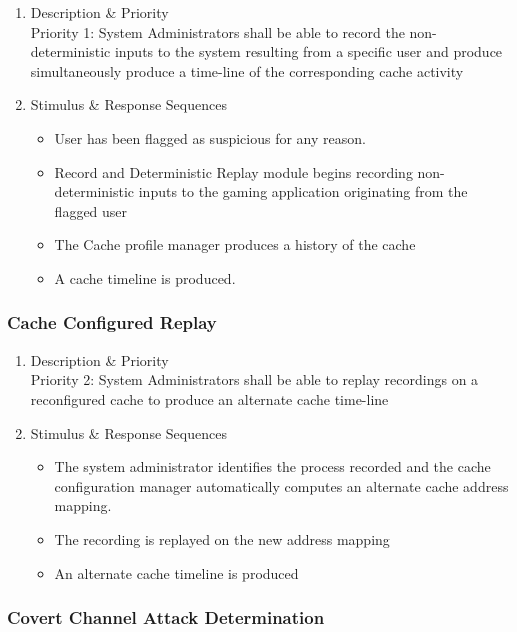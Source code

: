 \documentclass[12pt]{article}
\begin{document}
\begin{enumerate}
    \item Description \& Priority\\
    Priority 1: System Administrators shall be able to record the non-deterministic inputs to the system resulting
    from a specific user and produce simultaneously produce a time-line of the corresponding cache activity
    \item Stimulus \& Response Sequences
    \begin{itemize}
        \item User has been flagged as suspicious for any reason.
        \item Record and Deterministic Replay module begins recording non-deterministic inputs to the gaming
        application originating from the flagged user
        \item The Cache profile manager produces a history of the cache
        \item A cache timeline is produced.
    \end{itemize}
\end{enumerate}

\subsubsection{Cache Configured Replay}

\begin{enumerate}
    \item Description \& Priority\\
    Priority 2: System Administrators shall be able to replay recordings on a reconfigured cache to produce
    an alternate cache time-line
    \item Stimulus \& Response Sequences
    \begin{itemize}
        \item The system administrator identifies the process recorded and the cache configuration manager
        automatically computes an alternate cache address mapping.
        \item The recording is replayed on the new address mapping
        \item An alternate cache timeline is produced
    \end{itemize}
\end{enumerate}

\subsubsection{Covert Channel Attack Determination}
\end{document}
